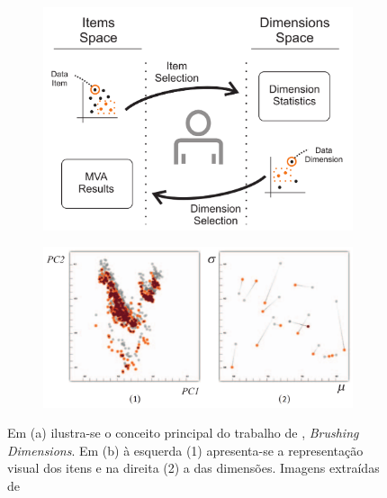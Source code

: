 \begin{figure}[h!] \centering
    \begin{subfigure}[b]{0.45\textwidth}
    \centering
    \includegraphics[width=\textwidth]{images/bd1.png}
    \caption{}
    \label{fig:bd1}
  \end{subfigure}%
  \begin{subfigure}[b]{0.55\textwidth}
    \centering
    \includegraphics[width=\textwidth]{images/bd2.png}
    \caption{}
    \label{fig:bd2}
  \end{subfigure}
  \caption[Brushing Dimensions]
  {Em (a) ilustra-se o conceito principal do trabalho de
  \citet{Turkay2011}, \emph{Brushing Dimensions}. Em (b) à
  esquerda (1) apresenta-se a representação visual dos itens
  e na direita (2) a das dimensões. Imagens extraídas de
  \cite{Turkay2011}}
  \label{fig:bd}
\end{figure}

